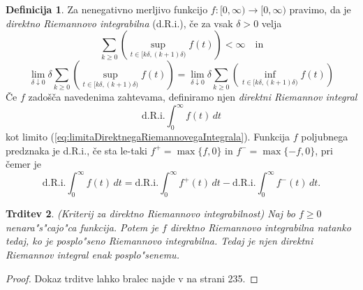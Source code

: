 \documentclass[12pt, a4paper, reqno]{amsart}
\theoremstyle{definition}
\newtheorem{definicija}{Definicija}[section]
\theoremstyle{plain}
\newtheorem{trditev}[definicija]{Trditev}
\newcommand{\1}{\mathds{1}}
\begin{document}
    \begin{definicija}
        Za nenegativno merljivo funkcijo \( f : [0, \infty) \to [0, \infty) \) pravimo, da je \textit{direktno 
        Riemannovo integrabilna} (d.R.i.), če za vsak $\delta > 0$ velja
        \begin{equation*}
            \sum_{k \geq 0} \left( \sup_{t \in [k\delta, (k+1)\delta)} f(t) \right) < \infty \quad \text{in}
        \end{equation*}
        \begin{equation}
             \lim_{\delta \downarrow 0} \delta \sum_{k \geq 0} \left( \sup_{t \in [k\delta, (k+1)\delta)} f(t) \right) = \lim_{\delta \downarrow 0} \delta \sum_{k \geq 0} \left( \inf_{t \in [k\delta, (k+1)\delta)} f(t) \right)
             \label{eq:limitaDirektnegaRiemannovegaIntegrala}
        \end{equation}
        Če \(f\) zadošča navedenima zahtevama, definiramo njen \textit{direktni Riemannov integral} 
        \[
        \text{d.R.i.} \int_{0}^{\infty} f(t) \, dt
        \]
        kot limito (\ref{eq:limitaDirektnegaRiemannovegaIntegrala}).
        Funkcija \(f\) poljubnega predznaka je d.R.i., če sta le-taki \(f^+ = \max\{f, 0\}\) in \(f^- = \max\{-f, 0\}\), pri čemer je
        \[
        \text{d.R.i.} \int_{0}^{\infty} f(t) \, dt = \text{d.R.i.} \int_{0}^{\infty} f^+(t) \, dt - \text{d.R.i.} \int_{0}^{\infty} f^-(t) \, dt.
        \]
        \label{def:direktnaRieamnovaIntegrabilnost}
    \end{definicija}

    \begin{trditev}(Kriterij za direktno Riemannovo integrabilnost)
        Naj bo $f \geq 0$ nenara"s"cajo"ca funkcija. Potem je $f$ direktno Riemannovo integrabilna natanko tedaj, ko je
        posplo"seno Riemannovo integrabilna. Tedaj je njen direktni Riemannov integral enak posplo"senemu.
        \label{trd:kriterijZaDirektnoRiemannovoIntegrabilnost}
    \end{trditev}

    \begin{proof}
        Dokaz trditve lahko bralec najde v \cite{8} na strani 235. 
    \end{proof} 
\end{document}
